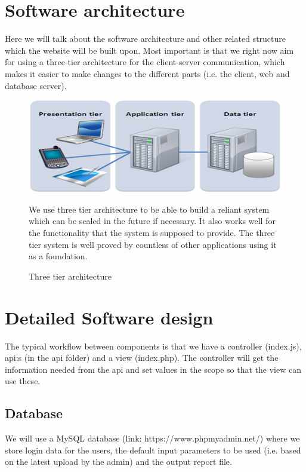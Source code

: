 \documentclass[]{article}
\begin{document}
\section{Software architecture}
Here we will talk about the software architecture and other related structure which the website will be built upon. Most important is that we right now aim for using a three-tier architecture for the client-server communication, which makes it easier to make changes to the different parts (i.e. the client, web and database server). 

\begin{figure}[H]
	\includegraphics[width=1.0\linewidth]{Bild3}
	\caption{Three tier architecture}
	\medskip
	\small
	We use three tier architecture to be able to build a reliant system which can be scaled in the future if necessary. It also works well for the functionality that the system is supposed to provide. The three tier system is well proved by countless of other applications using it as a foundation.
	\label{fig:Bild3}
\end{figure}

\section{Detailed Software design}
The typical workflow between components is that we have a controller (index.js), api:s (in the api folder) and a view (index.php). The controller will get the information needed from the api and set values in the scope so that the view can use these. 

\subsection{Database}
We will use a MySQL database (link: https://www.phpmyadmin.net/) where
we store login data for the users, the default input parameters to be used (i.e.
based on the latest upload by the admin) and the output report file.
\end{document}
